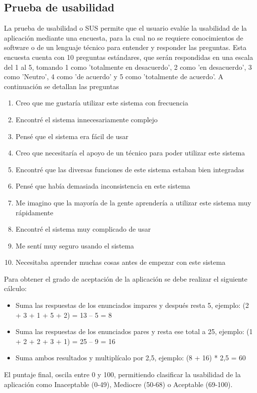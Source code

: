 ﻿\documentclass{iccmemoria}
\begin{document}
\subsection{Prueba de usabilidad}
La prueba de usabilidad o SUS permite que el usuario evalúe la usabilidad de la aplicación mediante una encuesta, para la cual no se requiere conocimientos de software o de un lenguaje técnico para entender y responder las preguntas. Esta encuesta cuenta con 10 preguntas estándares, que serán respondidas en una escala del 1 al 5, tomando 1 como 'totalmente en desacuerdo', 2 como 'en desacuerdo', 3 como 'Neutro', 4 como 'de acuerdo' y 5 como 'totalmente de acuerdo'. A continuación se detallan las preguntas
\begin{enumerate}

    \item Creo que me gustaría utilizar este sistema con frecuencia
    \item Encontré el sistema innecesariamente complejo
    \item Pensé que el sistema era fácil de usar
    \item Creo que necesitaría el apoyo de un técnico para poder utilizar este sistema
    \item Encontré que las diversas funciones de este sistema estaban bien integradas
    \item Pensé que había demasiada inconsistencia en este sistema
    \item Me imagino que la mayoría de la gente aprendería a utilizar este sistema muy rápidamente
    \item Encontré el sistema muy complicado de usar
    \item Me sentí muy seguro usando el sistema
    \item Necesitaba aprender muchas cosas antes de empezar con este sistema 
\end{enumerate}
Para obtener el grado de aceptación de la aplicación se debe realizar el siguiente cálculo:
\begin{itemize}
    \item Suma las respuestas de los enunciados impares y después resta 5, ejemplo: (2 + 3 + 1 + 5 + 2) = 13 – 5 = 8
    
    \item Suma las respuestas de los enunciados pares y resta ese total a 25, ejemplo: (1 + 2 + 2 + 3 + 1) = 25 – 9 = 16
    
    \item Suma ambos resultados y multiplícalo por 2,5, ejemplo: (8 + 16) * 2,5 = 60
    
\end{itemize}
El puntaje final, oscila entre 0 y 100, permitiendo clasificar la usabilidad de la aplicación como Inaceptable (0-49), Mediocre (50-68) o Aceptable (69-100).
\endgroup
\end{document}
